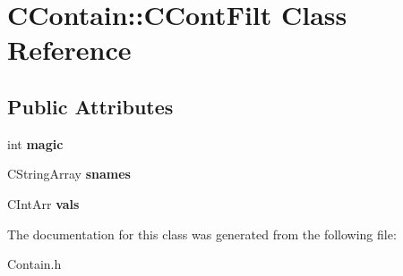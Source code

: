 \hypertarget{class_c_contain_1_1_c_cont_filt}{\section{C\-Contain\-:\-:C\-Cont\-Filt Class Reference}
\label{class_c_contain_1_1_c_cont_filt}
}
\subsection*{Public Attributes}
\begin{DoxyCompactItemize}
\item 
\hypertarget{class_c_contain_1_1_c_cont_filt_a8f65913127cee1cb43ab480c83fa21c7}{int {\bfseries magic}}\label{class_c_contain_1_1_c_cont_filt_a8f65913127cee1cb43ab480c83fa21c7}

\item 
\hypertarget{class_c_contain_1_1_c_cont_filt_a27d56fbad46fa98c75495a26fd490d4b}{C\-String\-Array {\bfseries snames}}\label{class_c_contain_1_1_c_cont_filt_a27d56fbad46fa98c75495a26fd490d4b}

\item 
\hypertarget{class_c_contain_1_1_c_cont_filt_a481d1022f9f813a233b547e86523c849}{C\-Int\-Arr {\bfseries vals}}\label{class_c_contain_1_1_c_cont_filt_a481d1022f9f813a233b547e86523c849}

\end{DoxyCompactItemize}


The documentation for this class was generated from the following file\-:\begin{DoxyCompactItemize}
\item 
Contain.\-h\end{DoxyCompactItemize}
